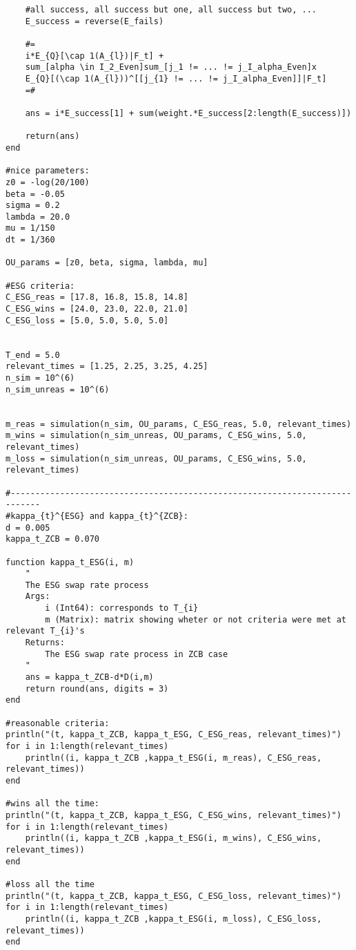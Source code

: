 \begin{verbatim}
    #all success, all success but one, all success but two, ... 
    E_success = reverse(E_fails)
    
    #=
    i*E_{Q}[\cap 1(A_{l})|F_t] + 
    sum_[alpha \in I_2_Even]sum_[j_1 != ... != j_I_alpha_Even]x
    E_{Q}[(\cap 1(A_{l}))^[[j_{1} != ... != j_I_alpha_Even]]|F_t] 
    =#

    ans = i*E_success[1] + sum(weight.*E_success[2:length(E_success)])

    return(ans)
end

#nice parameters:
z0 = -log(20/100)
beta = -0.05
sigma = 0.2
lambda = 20.0
mu = 1/150
dt = 1/360

OU_params = [z0, beta, sigma, lambda, mu]

#ESG criteria:
C_ESG_reas = [17.8, 16.8, 15.8, 14.8]
C_ESG_wins = [24.0, 23.0, 22.0, 21.0]
C_ESG_loss = [5.0, 5.0, 5.0, 5.0]


T_end = 5.0
relevant_times = [1.25, 2.25, 3.25, 4.25]
n_sim = 10^(6)
n_sim_unreas = 10^(6)


m_reas = simulation(n_sim, OU_params, C_ESG_reas, 5.0, relevant_times)
m_wins = simulation(n_sim_unreas, OU_params, C_ESG_wins, 5.0, relevant_times)
m_loss = simulation(n_sim_unreas, OU_params, C_ESG_wins, 5.0, relevant_times)

#----------------------------------------------------------------------------
#kappa_{t}^{ESG} and kappa_{t}^{ZCB}: 
d = 0.005
kappa_t_ZCB = 0.070

function kappa_t_ESG(i, m)
    " 
    The ESG swap rate process 
    Args: 
        i (Int64): corresponds to T_{i}
        m (Matrix): matrix showing wheter or not criteria were met at relevant T_{i}'s
    Returns: 
        The ESG swap rate process in ZCB case 
    "
    ans = kappa_t_ZCB-d*D(i,m)
    return round(ans, digits = 3)
end

#reasonable criteria:
println("(t, kappa_t_ZCB, kappa_t_ESG, C_ESG_reas, relevant_times)")
for i in 1:length(relevant_times)
    println((i, kappa_t_ZCB ,kappa_t_ESG(i, m_reas), C_ESG_reas, relevant_times))
end

#wins all the time:
println("(t, kappa_t_ZCB, kappa_t_ESG, C_ESG_wins, relevant_times)")
for i in 1:length(relevant_times)
    println((i, kappa_t_ZCB ,kappa_t_ESG(i, m_wins), C_ESG_wins, relevant_times))
end

#loss all the time
println("(t, kappa_t_ZCB, kappa_t_ESG, C_ESG_loss, relevant_times)")
for i in 1:length(relevant_times)
    println((i, kappa_t_ZCB ,kappa_t_ESG(i, m_loss), C_ESG_loss, relevant_times))
end


\end{verbatim}
